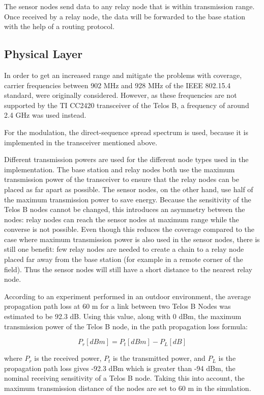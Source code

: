 \documentclass[conference]{IEEEtran}
\begin{document}
The sensor nodes send data to any relay node that is within transmission range.
Once received by a relay node, the data will be forwarded to the base station
with the help of a routing protocol.

\subsection{Physical Layer}

In order to get an increased range and mitigate the problems with coverage,
carrier frequencies between 902 MHz and 928 MHz of the IEEE 802.15.4 standard,
were originally considered. However, as these frequencies are not supported by
the TI CC2420 transceiver of the Telos B, a frequency of around 2.4 GHz was
used instead.

For the modulation, the direct-sequence spread spectrum is used, because it is
implemented in the transceiver mentioned above.

Different transmission powers are used for the different node types used in the
implementation. The base station and relay nodes both use the maximum
transmission power of the transceiver to ensure that the relay nodes can be
placed as far apart as possible.  The sensor nodes, on the other hand, use half
of the maximum transmission power to save energy. Because the sensitivity of
the Telos B nodes cannot be changed, this introduces an asymmetry between the
nodes: relay nodes can reach the sensor nodes at maximum range while the
converse is not possible.  Even though this reduces the coverage compared to
the case where maximum transmission power is also used in the sensor nodes,
there is still one benefit: few relay nodes are needed to create a chain to
a relay node placed far away from the base station (for example in a remote
corner of the field). Thus the sensor nodes will still have a short distance to
the nearest relay node.

According to an experiment performed in an outdoor environment, the average
propagation path loss at 60 m for a link between two Telos B Nodes was
estimated to be 92.3 dB. Using this value, along with 0 dBm, the maximum
transmission power of the Telos B node, in the path propagation loss formula:

\begin{displaymath}
    P_{r}[dBm] = P_{t}[dBm] - P_{L}[dB]
\end{displaymath}

where $P_{r}$ is the received power, $P_{t}$ is the transmitted power, and
$P_{L}$ is the propagation path loss gives -92.3 dBm which is greater than -94
dBm, the nominal receiving sensitivity of a Telos B node. Taking this into
account, the maximum transmission distance of the nodes are set to 60 m in the
simulation.
\end{document}
